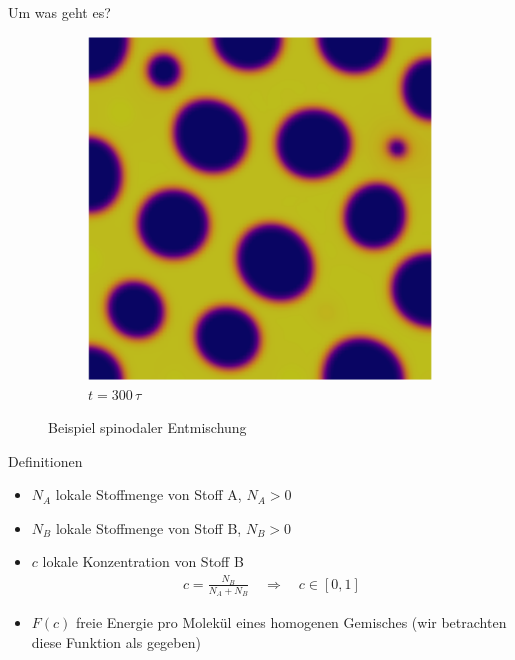 \begin{frame}{Um was geht es?}
{\begin{figure}
\begin{subfigure}{0.18\textwidth}
\includegraphics[width=\textwidth]{images/ch_sim/300.pdf}
\caption{$t = 300\,\tau$}
\end{subfigure}
\caption{Beispiel spinodaler Entmischung}
\end{figure}
}
\end{frame}

\begin{frame}{Definitionen}
\begin{itemize}
\item<+-> $N_A$ lokale Stoffmenge von Stoff A, $N_A > 0$
\item<+-> $N_B$ lokale Stoffmenge von Stoff B, $N_B > 0$
\item<+-> $c$ lokale Konzentration von Stoff B
\begin{align*}
c
=
\frac{N_B}{N_A + N_B}
\quad \Rightarrow \quad c \in [0, 1]
\end{align*}
\item<+-> $F(c)$ freie Energie pro Molekül eines homogenen Gemisches
(wir betrachten diese Funktion als gegeben)
\end{itemize}
\end{frame}

